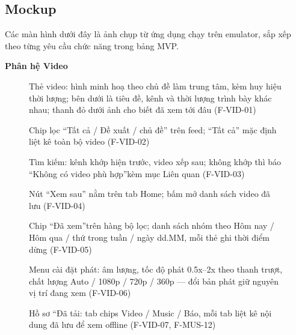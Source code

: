 \subsection{Mockup}
\label{sec:wireframes-prototypes}

Các màn hình dưới đây là ảnh chụp từ ứng dụng chạy trên emulator, sắp xếp theo từng yêu cầu chức năng trong bảng MVP.

\textbf{Phân hệ Video}\\[6pt]
\begin{figure}[H]
\centering
{}
\caption{\small Thẻ video: hình minh hoạ theo chủ đề làm trung tâm, kèm huy hiệu thời lượng; bên dưới là tiêu đề, kênh và thời lượng trình bày khác nhau; thanh đỏ dưới ảnh cho biết đã xem tới đâu (F-VID-01)}
\end{figure}
\begin{figure}[H]
\centering
{}
\caption{\small Chip lọc ``Tất cả / Đề xuất / chủ đề'' trên feed; ``Tất cả'' mặc định liệt kê toàn bộ video (F-VID-02)}
\end{figure}
\begin{figure}[H]
\centering
{}
\caption{\small Tìm kiếm: kênh khớp hiện trước, video xếp sau; không khớp thì báo ``Không có video phù hợp''kèm mục Liên quan (F-VID-03)}
\end{figure}
\begin{figure}[H]
\centering
{}
\caption{\small Nút ``Xem sau'' nằm trên tab Home; bấm mở danh sách video đã lưu (F-VID-04)}
\end{figure}
\begin{figure}[H]
\centering
{}
\caption{\small Chip ``Đã xem''trên hàng bộ lọc; danh sách nhóm theo Hôm nay / Hôm qua / thứ trong tuần / ngày dd.MM, mỗi thẻ ghi thời điểm dừng (F-VID-05)}
\end{figure}
\begin{figure}[H]
\centering
{}
\caption{\small Menu cài đặt phát: âm lượng, tốc độ phát 0.5x--2x theo thanh trượt, chất lượng Auto / 1080p / 720p / 360p --- đổi bản phát giữ nguyên vị trí đang xem (F-VID-06)}
\end{figure}
\begin{figure}[H]
\centering
{}
\caption{\small Hồ sơ ``Đã tải: tab chips Video / Music / Báo, mỗi tab liệt kê nội dung đã lưu để xem offline (F-VID-07, F-MUS-12)}
\end{figure}
